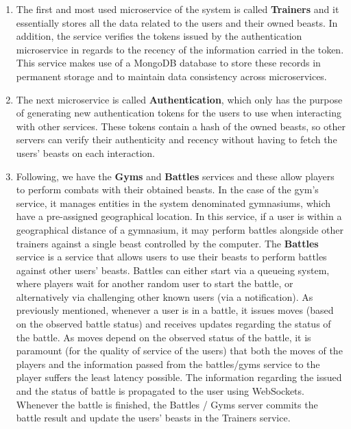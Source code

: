 \begin{enumerate}
    \item The first and most used microservice of the system is called \textbf{Trainers} and it essentially stores all the data related to the users and their owned beasts. In addition, the service verifies the tokens issued by the authentication microservice in regards to the recency of the information carried in the token. This service makes use of a MongoDB  database to store these records in permanent storage and to maintain data consistency across microservices.
    
    \item The next microservice is called \textbf{Authentication}, which only has the purpose of generating new authentication tokens for the users to use when interacting with other services. These tokens contain a hash of the owned beasts, so other servers can verify their authenticity and recency without having to fetch the users' beasts on each interaction.

    \item Following, we have the \textbf{Gyms} and \textbf{Battles} services and these allow players to perform combats with their obtained beasts. In the case of the gym's service, it manages entities in the system denominated gymnasiums, which have a pre-assigned geographical location. In this service, if a user is within a geographical distance of a gymnasium, it may perform battles alongside other trainers against a single beast controlled by the computer. The \textbf{Battles} service is a service that allows users to use their beasts to perform battles against other users' beasts. Battles can either start via a queueing system, where players wait for another random user to start the battle, or alternatively via challenging other known users (via a notification). As previously mentioned, whenever a user is in a battle, it issues moves (based on the observed battle status) and receives updates regarding the status of the battle. As moves depend on the observed status of the battle, it is paramount (for the quality of service of the users) that both the moves of the players and the information passed from the battles/gyms service to the player suffers the least latency possible. The information regarding the issued and the status of battle is propagated to the user using WebSockets. Whenever the battle is finished, the Battles / Gyms server commits the battle result and update the users' beasts in the Trainers service.
    

\end{enumerate}
